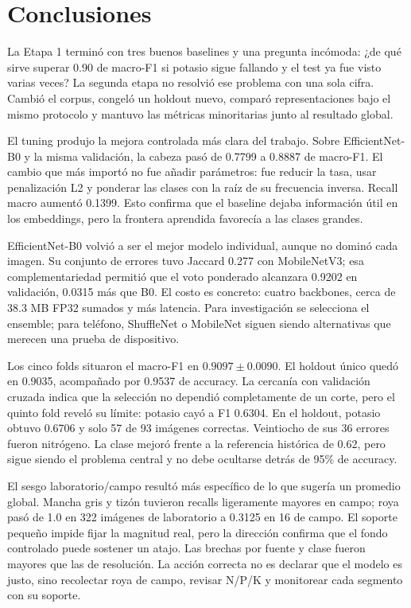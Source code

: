 \section{Conclusiones}

La Etapa 1 terminó con tres buenos baselines y una pregunta incómoda: ¿de qué
sirve superar 0.90 de macro-F1 si potasio sigue fallando y el test ya fue visto
varias veces? La segunda etapa no resolvió ese problema con una sola cifra.
Cambió el corpus, congeló un holdout nuevo, comparó representaciones bajo el
mismo protocolo y mantuvo las métricas minoritarias junto al resultado global.

El tuning produjo la mejora controlada más clara del trabajo. Sobre
EfficientNet-B0 y la misma validación, la cabeza pasó de 0.7799 a 0.8887 de
macro-F1. El cambio que más importó no fue añadir parámetros: fue reducir la
tasa, usar penalización L2 y ponderar las clases con la raíz de su frecuencia
inversa. Recall macro aumentó 0.1399. Esto confirma que el baseline dejaba
información útil en los embeddings, pero la frontera aprendida favorecía a las
clases grandes.

EfficientNet-B0 volvió a ser el mejor modelo individual, aunque no dominó cada
imagen. Su conjunto de errores tuvo Jaccard 0.277 con MobileNetV3; esa
complementariedad permitió que el voto ponderado alcanzara 0.9202 en
validación, 0.0315 más que B0. El costo es concreto: cuatro backbones, cerca de
38.3 MB FP32 sumados y más latencia. Para investigación se selecciona el
ensemble; para teléfono, ShuffleNet o MobileNet siguen siendo alternativas que
merecen una prueba de dispositivo.

Los cinco folds situaron el macro-F1 en $0.9097\pm0.0090$. El holdout único
quedó en 0.9035, acompañado por 0.9537 de accuracy. La cercanía con validación
cruzada indica que la selección no dependió completamente de un corte, pero el
quinto fold reveló su límite: potasio cayó a F1 0.6304. En el holdout, potasio
obtuvo 0.6706 y solo 57 de 93 imágenes correctas. Veintiocho de sus 36 errores
fueron nitrógeno. La clase mejoró frente a la referencia histórica de 0.62,
pero sigue siendo el problema central y no debe ocultarse detrás de 95\% de
accuracy.

El sesgo laboratorio/campo resultó más específico de lo que sugería un promedio
global. Mancha gris y tizón tuvieron recalls ligeramente mayores en campo;
roya pasó de 1.0 en 322 imágenes de laboratorio a 0.3125 en 16 de campo. El
soporte pequeño impide fijar la magnitud real, pero la dirección confirma que
el fondo controlado puede sostener un atajo. Las brechas por fuente y clase
fueron mayores que las de resolución. La acción correcta no es declarar que el
modelo es justo, sino recolectar roya de campo, revisar N/P/K y monitorear cada
segmento con su soporte.


